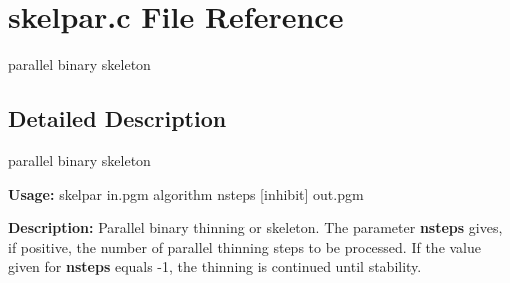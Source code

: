 \section{skelpar.c File Reference}
\label{skelpar_8c}
parallel binary skeleton 



\subsection{Detailed Description}
parallel binary skeleton 

{\bf Usage:} skelpar in.pgm algorithm nsteps [inhibit] out.pgm

{\bf Description:} Parallel binary thinning or skeleton. The parameter {\bf nsteps} gives, if positive, the number of parallel thinning steps to be processed. If the value given for {\bf nsteps} equals -1, the thinning is continued until stability.

